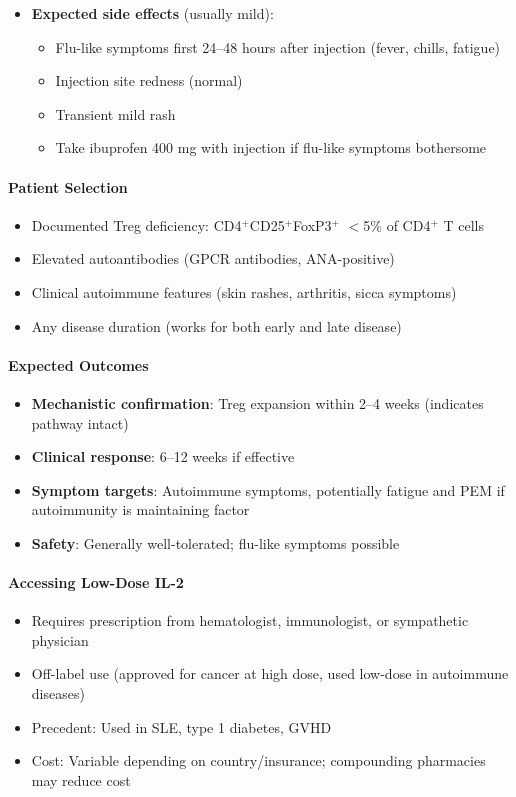 \begin{itemize}
    \item \textbf{Expected side effects} (usually mild):
    \begin{itemize}
        \item Flu-like symptoms first 24--48 hours after injection (fever, chills, fatigue)
        \item Injection site redness (normal)
        \item Transient mild rash
        \item Take ibuprofen 400 mg with injection if flu-like symptoms bothersome
    \end{itemize}
\end{itemize}

\paragraph{Patient Selection}
\begin{itemize}
    \item Documented Treg deficiency: CD4$^+$CD25$^+$FoxP3$^+$ $<$5\% of CD4$^+$ T cells
    \item Elevated autoantibodies (GPCR antibodies, ANA-positive)
    \item Clinical autoimmune features (skin rashes, arthritis, sicca symptoms)
    \item Any disease duration (works for both early and late disease)
\end{itemize}

\paragraph{Expected Outcomes}
\begin{itemize}
    \item \textbf{Mechanistic confirmation}: Treg expansion within 2--4 weeks (indicates pathway intact)
    \item \textbf{Clinical response}: 6--12 weeks if effective
    \item \textbf{Symptom targets}: Autoimmune symptoms, potentially fatigue and PEM if autoimmunity is maintaining factor
    \item \textbf{Safety}: Generally well-tolerated; flu-like symptoms possible
\end{itemize}

\paragraph{Accessing Low-Dose IL-2}
\begin{itemize}
    \item Requires prescription from hematologist, immunologist, or sympathetic physician
    \item Off-label use (approved for cancer at high dose, used low-dose in autoimmune diseases)
    \item Precedent: Used in SLE, type 1 diabetes, GVHD
    \item Cost: Variable depending on country/insurance; compounding pharmacies may reduce cost
\end{itemize}

